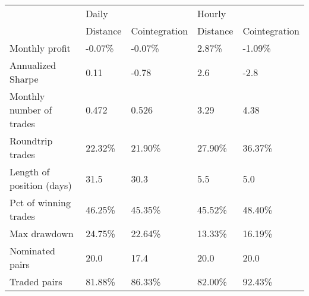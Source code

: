\begin{tabular}{lllll}
\toprule
{} & \multicolumn{2}{l}{Daily} & \multicolumn{2}{l}{Hourly} \\
{} & Distance & Cointegration & Distance & Cointegration \\
\midrule
Monthly profit            &  -0.07\% &       -0.07\% &   2.87\% &       -1.09\% \\
Annualized Sharpe         &     0.11 &         -0.78 &      2.6 &          -2.8 \\
Monthly number of trades  &    0.472 &         0.526 &     3.29 &          4.38 \\
Roundtrip trades          &  22.32\% &       21.90\% &  27.90\% &       36.37\% \\
Length of position (days) &     31.5 &          30.3 &      5.5 &           5.0 \\
Pct of winning trades     &  46.25\% &       45.35\% &  45.52\% &       48.40\% \\
Max drawdown              &  24.75\% &       22.64\% &  13.33\% &       16.19\% \\
Nominated pairs           &     20.0 &          17.4 &     20.0 &          20.0 \\
Traded pairs              &  81.88\% &       86.33\% &  82.00\% &       92.43\% \\
\bottomrule
\end{tabular}
